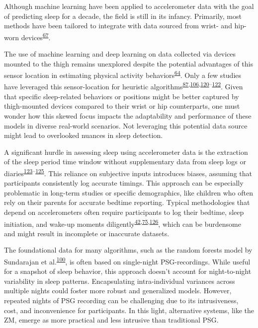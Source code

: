 \documentclass[
  10pt,
]{scrbook}
\begin{document}
Although machine learning have been applied to accelerometer data with
the goal of predicting sleep for a decade, the field is still in its
infancy. Primarily, most methods have been tailored to integrate with
data sourced from wrist- and hip-worn
devices\textsuperscript{\protect\hyperlink{ref-conley_agreement_2019}{67}}.

The use of machine learning and deep learning on data collected via
devices mounted to the thigh remains unexplored despite the potential
advantages of this sensor location in estimating physical activity
behaviors\textsuperscript{\protect\hyperlink{ref-bruxf8nd_2020}{64}}.
Only a few studies have leveraged this sensor-location for heuristic
algorithms\textsuperscript{\protect\hyperlink{ref-johansson_development_2023}{87},\protect\hyperlink{ref-winkler_identifying_2016}{106},\protect\hyperlink{ref-carlson_validity_2021}{120}--\protect\hyperlink{ref-van_der_berg_identifying_2016}{122}}.
Given that specific sleep-related behaviors or positions might be better
captured by thigh-mounted devices compared to their wrist or hip
counterparts, one must wonder how this skewed focus impacts the
adaptability and performance of these models in diverse real-world
scenarios. Not leveraging this potential data source might lead to
overlooked nuances in sleep detection.

A significant hurdle in assessing sleep using accelerometer data is the
extraction of the sleep period time window without supplementary data
from sleep logs or
diaries\textsuperscript{\protect\hyperlink{ref-doherty_large_2017}{123}--\protect\hyperlink{ref-anderson_assessment_2014}{125}}.
This reliance on subjective inputs introduces biases, assuming that
participants consistently log accurate timings. This approach can be
especially problematic in long-term studies or specific demographics,
like children who often rely on their parents for accurate bedtime
reporting. Typical methodologies that depend on accelerometers often
require participants to log their bedtime, sleep initiation, and wake-up
moments
diligently\textsuperscript{\protect\hyperlink{ref-girschik_validation_2012}{42},\protect\hyperlink{ref-littner_2003}{75},\protect\hyperlink{ref-lockley_1999}{126}},
which can be burdensome and might result in incomplete or inaccurate
datasets.

The foundational data for many algorithms, such as the random forests
model by Sundarajan et
al.\textsuperscript{\protect\hyperlink{ref-sundararajan_sleep_2021}{100}},
is often based on single-night PSG-recordings. While useful for a
snapshot of sleep behavior, this approach doesn't account for
night-to-night variability in sleep patterns. Encapsulating
intra-individual variances across multiple nights could foster more
robust and generalized models. However, repeated nights of PSG recording
can be challenging due to its intrusiveness, cost, and inconvenience for
participants. In this light, alternative systems, like the ZM, emerge as
more practical and less intrusive than traditional PSG.
\end{document}
